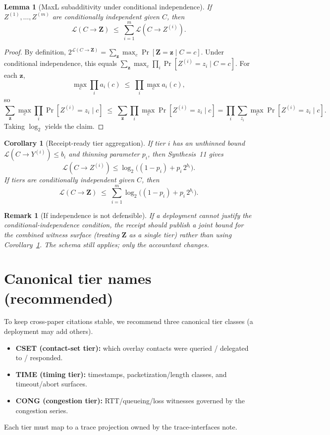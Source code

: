 \documentclass[11pt]{article}
\newtheorem{lemma}{Lemma}
\newtheorem{corollary}{Corollary}
\newtheorem{remark}{Remark}
\theoremstyle{definition}
\newcommand{\MaxL}{\mathcal{L}}
\begin{document}
\begin{lemma}[MaxL subadditivity under conditional independence]\label{lem:maxl-add}
If $Z^{(1)},\dots,Z^{(m)}$ are conditionally independent given $C$, then
\[\MaxL(C\to \mathbf{Z}) \;\le\; \sum_{i=1}^m \MaxL(C\to Z^{(i)}).\]
\end{lemma}
\begin{proof}
By definition, $2^{\MaxL(C\to \mathbf{Z})}=\sum_{\mathbf{z}}\max_c \Pr[\mathbf{Z}=\mathbf{z}\mid C=c]$.
Under conditional independence, this equals $\sum_{\mathbf{z}}\max_c \prod_i \Pr[Z^{(i)}=z_i\mid C=c]$.
For each $\mathbf{z}$,
\[\max_c \prod_i a_i(c) \;\le\; \prod_i \max_c a_i(c),\]
so
\[\sum_{\mathbf{z}}\max_c \prod_i \Pr[Z^{(i)}=z_i\mid c] \;\le\; \sum_{\mathbf{z}} \prod_i \max_c \Pr[Z^{(i)}=z_i\mid c]
= \prod_i \sum_{z_i} \max_c \Pr[Z^{(i)}=z_i\mid c].\]
Taking $\log_2$ yields the claim.
\end{proof}

\begin{corollary}[Receipt-ready tier aggregation]\label{cor:receipt-agg}
If tier $i$ has an unthinned bound $\MaxL(C\to Y^{(i)})\le b_i$ and thinning parameter $p_i$, then Synthesis~11 gives
\[\MaxL(C\to Z^{(i)}) \le \log_2\big((1-p_i)+p_i\,2^{b_i}\big).\]
If tiers are conditionally independent given $C$, then
\[\MaxL(C\to \mathbf{Z}) \;\le\; \sum_{i=1}^m \log_2\big((1-p_i)+p_i\,2^{b_i}\big).\]
\end{corollary}

\begin{remark}[If independence is not defensible]
If a deployment cannot justify the conditional-independence condition, the receipt should publish a joint bound for the combined witness surface (treating $\mathbf{Z}$ as a single tier) rather than using Corollary~\ref{cor:receipt-agg}.
The schema still applies; only the accountant changes.\cite{series:receiptitems}
\end{remark}

\section{Canonical tier names (recommended)}
To keep cross-paper citations stable, we recommend three canonical tier classes (a deployment may add others).
\begin{itemize}[leftmargin=1.2em]
\item \textbf{CSET (contact-set tier):} which overlay contacts were queried / delegated to / responded.
\item \textbf{TIME (timing tier):} timestamps, packetization/length classes, and timeout/abort surfaces.
\item \textbf{CONG (congestion tier):} RTT/queueing/loss witnesses governed by the congestion series.
\end{itemize}
Each tier must map to a trace projection owned by the trace-interfaces note.\cite{series:traceifaces}
\end{document}
